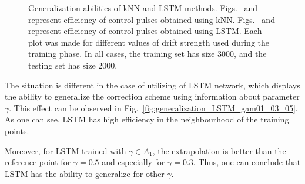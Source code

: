 \documentclass[aps,pra,showkeys,showpacs,notitlepage,superscriptaddress]{revtex4-1}
\newcommand{\1}{{\rm 1\hspace{-0.9mm}l}}
\begin{document}
\begin{figure}[ht!]
  \centering    
  


\caption{
  Generalization abilities of kNN and LSTM methods. Figs.~ and 
   represent efficiency of control pulses obtained using kNN. Figs.~ and  represent efficiency of control pulses obtained using LSTM. Each plot was made for different values of drift strength used during the training phase.
  In all cases, the training set has size 3000, and the testing set has size 2000.}
\label{fig:training_with_gamma}
\end{figure}


The situation is different in the case of utilizing of LSTM network, which displays the ability to generalize the correction scheme using information about parameter $\gamma$. This effect can be observed in Fig.~\ref{fig:generalization_LSTM_gam01_03_05}. As one can see, LSTM has high efficiency in the neighbourhood of the training points.
 
Moreover, for LSTM trained with $\gamma \in A_1$, the extrapolation is better than the reference point for $\gamma=0.5$ and especially for $\gamma=0.3$. Thus, one can conclude that LSTM has the ability to generalize for other $\gamma$.
\end{document}

